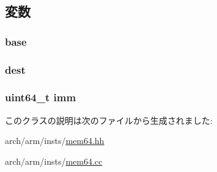 \subsection{変数}
\hypertarget{classArmISA_1_1SysDC64_ad7a926fdfe0820284d654e9139a423b2}{
\subsubsection[{base}]{ {\bf base}}}
\label{classArmISA_1_1SysDC64_ad7a926fdfe0820284d654e9139a423b2}
\hypertarget{classArmISA_1_1SysDC64_aec72e8e45bdc87abeeeb75d2a8a9a716}{
\subsubsection[{dest}]{ {\bf dest}}}
\label{classArmISA_1_1SysDC64_aec72e8e45bdc87abeeeb75d2a8a9a716}
\hypertarget{classArmISA_1_1SysDC64_a2b4406ad2843b5aa12d244d01d8fdc69}{
\subsubsection[{imm}]{\setlength{\rightskip}{0pt plus 5cm}uint64\_\-t {\bf imm}}}
\label{classArmISA_1_1SysDC64_a2b4406ad2843b5aa12d244d01d8fdc69}


このクラスの説明は次のファイルから生成されました:\begin{DoxyCompactItemize}
\item 
arch/arm/insts/\hyperlink{mem64_8hh}{mem64.hh}\item 
arch/arm/insts/\hyperlink{mem64_8cc}{mem64.cc}\end{DoxyCompactItemize}
